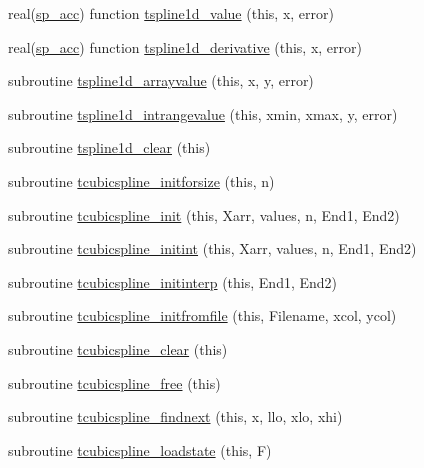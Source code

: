 \begin{DoxyCompactItemize}
real(\mbox{\hyperlink{namespaceinterpolation_af72aa9a05feb8ef90b2d26e4a013abf3}{sp\+\_\+acc}}) function \mbox{\hyperlink{namespaceinterpolation_a7a675d7e22aea0d85c1c2241ee6c221f}{tspline1d\+\_\+value}} (this, x, error)
\item 
real(\mbox{\hyperlink{namespaceinterpolation_af72aa9a05feb8ef90b2d26e4a013abf3}{sp\+\_\+acc}}) function \mbox{\hyperlink{namespaceinterpolation_aec275a9deb7e4578d9d8c310b0dea093}{tspline1d\+\_\+derivative}} (this, x, error)
\item 
subroutine \mbox{\hyperlink{namespaceinterpolation_a1bb0d4fae1b5125618e2e9f67669bd3c}{tspline1d\+\_\+arrayvalue}} (this, x, y, error)
\item 
subroutine \mbox{\hyperlink{namespaceinterpolation_aa9eedb8594564e9a0e57ee8a5282837a}{tspline1d\+\_\+intrangevalue}} (this, xmin, xmax, y, error)
\item 
subroutine \mbox{\hyperlink{namespaceinterpolation_ab31f5a781a449692250e4a0ab0ec432c}{tspline1d\+\_\+clear}} (this)
\item 
subroutine \mbox{\hyperlink{namespaceinterpolation_a7f58be276bbe7b10b95a7e156a4bc0b8}{tcubicspline\+\_\+initforsize}} (this, n)
\item 
subroutine \mbox{\hyperlink{namespaceinterpolation_a36b9a543d32de4944ae9289358f15a5a}{tcubicspline\+\_\+init}} (this, Xarr, values, n, End1, End2)
\item 
subroutine \mbox{\hyperlink{namespaceinterpolation_aa6887491230c995c13b123b7847269ec}{tcubicspline\+\_\+initint}} (this, Xarr, values, n, End1, End2)
\item 
subroutine \mbox{\hyperlink{namespaceinterpolation_a141de3ad802bf42f3810c24e47e31310}{tcubicspline\+\_\+initinterp}} (this, End1, End2)
\item 
subroutine \mbox{\hyperlink{namespaceinterpolation_a89e495ca87c6f696d6aac646fd227f03}{tcubicspline\+\_\+initfromfile}} (this, Filename, xcol, ycol)
\item 
subroutine \mbox{\hyperlink{namespaceinterpolation_aef383fa49a233bca20a6cd742319df7e}{tcubicspline\+\_\+clear}} (this)
\item 
subroutine \mbox{\hyperlink{namespaceinterpolation_a953dc25c7196a60416148edc8944b39e}{tcubicspline\+\_\+free}} (this)
\item 
subroutine \mbox{\hyperlink{namespaceinterpolation_a2ffb9d3c161ab80ba29f5256b039ea57}{tcubicspline\+\_\+findnext}} (this, x, llo, xlo, xhi)
\item 
subroutine \mbox{\hyperlink{namespaceinterpolation_abaeaf4f39b2dbd78b28a5e1802475739}{tcubicspline\+\_\+loadstate}} (this, F)

\end{DoxyCompactItemize}
